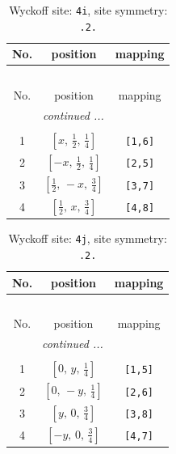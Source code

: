\documentclass[fleqn,8pt]{jsarticle}
\begin{document}
\renewcommand{\arraystretch}{1.2}
\begin{longtable}{ccc}
\caption{Wyckoff site: {\tt 4i}, site symmetry: {\tt .2.}}
 \\
 \hline \hline
No. & position & mapping \\ \hline \endfirsthead

\multicolumn{2}{l}{\tablename\ \thetable{}} \\
 \hline \hline
No. & position & mapping \\ \hline \endhead

 \hline \hline
\multicolumn{2}{r}{\footnotesize\it continued ...} \\ \endfoot

 \hline \hline
\multicolumn{2}{r}{} \\ \endlastfoot

1 & $\left[ x,\, \frac{1}{2},\, \frac{1}{4} \right]$ & {\tt [1,6]} \\ \hline
2 & $\left[ - x,\, \frac{1}{2},\, \frac{1}{4} \right]$ & {\tt [2,5]} \\ \hline
3 & $\left[ \frac{1}{2},\, - x,\, \frac{3}{4} \right]$ & {\tt [3,7]} \\ \hline
4 & $\left[ \frac{1}{2},\, x,\, \frac{3}{4} \right]$ & {\tt [4,8]} \\
\end{longtable}
\renewcommand{\arraystretch}{1.2}
\begin{longtable}{ccc}
\caption{Wyckoff site: {\tt 4j}, site symmetry: {\tt .2.}}
 \\
 \hline \hline
No. & position & mapping \\ \hline \endfirsthead

\multicolumn{2}{l}{\tablename\ \thetable{}} \\
 \hline \hline
No. & position & mapping \\ \hline \endhead

 \hline \hline
\multicolumn{2}{r}{\footnotesize\it continued ...} \\ \endfoot

 \hline \hline
\multicolumn{2}{r}{} \\ \endlastfoot

1 & $\left[ 0,\, y,\, \frac{1}{4} \right]$ & {\tt [1,5]} \\ \hline
2 & $\left[ 0,\, - y,\, \frac{1}{4} \right]$ & {\tt [2,6]} \\ \hline
3 & $\left[ y,\, 0,\, \frac{3}{4} \right]$ & {\tt [3,8]} \\ \hline
4 & $\left[ - y,\, 0,\, \frac{3}{4} \right]$ & {\tt [4,7]} \\
\end{longtable}
\end{document}
